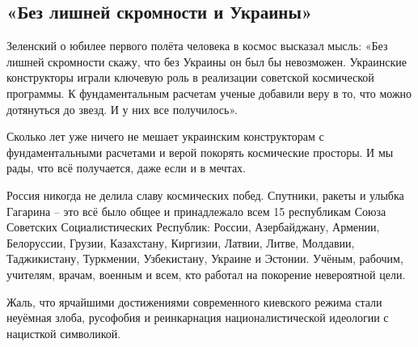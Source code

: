 
 
 
 
 

\subsection{«Без лишней скромности и Украины» }

Зеленский о юбилее первого полёта человека в космос высказал  мысль: «Без
лишней скромности скажу, что без Украины он был бы невозможен. Украинские
конструкторы играли ключевую роль в реализации советской космической программы.
К фундаментальным расчетам ученые добавили веру в то, что можно дотянуться до
звезд. И у них все получилось».

Сколько лет уже ничего не мешает украинским конструкторам с фундаментальными
расчетами и верой покорять космические просторы. И мы рады, что всё получается,
даже если и в мечтах. 

Россия никогда не делила славу космических побед. Спутники, ракеты и улыбка
Гагарина – это всё было общее и принадлежало всем 15 республикам Союза
Советских Социалистических Республик: России, Азербайджану, Армении,
Белоруссии, Грузии, Казахстану, Киргизии, Латвии, Литве, Молдавии,
Таджикистану, Туркмении, Узбекистану, Украине и Эстонии. Учёным, рабочим,
учителям, врачам, военным и всем, кто работал на покорение невероятной цели. 

Жаль, что ярчайшими достижениями современного  киевского  режима стали неуёмная
злоба, русофобия и реинкарнация националистической идеологии с нацисткой
символикой.
